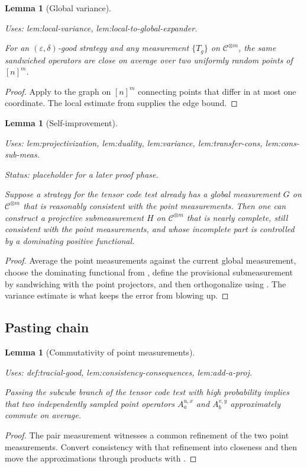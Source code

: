 \documentclass{article}
\providecommand{\uses}[1]{\par\smallskip\noindent\emph{Uses:} #1.\par\smallskip}
\providecommand{\notready}{\par\smallskip\noindent\emph{Status: placeholder for a later proof phase.}\par\smallskip}
\newtheorem{lemma}[definition]{Lemma}
\theoremstyle{remark}
\newcommand{\code}{\mathcal{C}}
\newcommand{\eps}{\varepsilon}
\begin{document}
\begin{lemma}[Global variance]\label{lem:variance}
  \uses{lem:local-variance, lem:local-to-global-expander}
  For an $(\eps,\delta)$-good strategy and any measurement $\{T_g\}$ on $\code^{\otimes m}$, the same sandwiched operators are close on average over two uniformly random points of $[n]^m$.
\end{lemma}
\begin{proof}
  Apply  to the graph on $[n]^m$ connecting points that differ in at most one coordinate. The local estimate from  supplies the edge bound.
\end{proof}

\begin{lemma}[Self-improvement]\label{lem:self-improvement}
  \uses{lem:projectivization, lem:duality, lem:variance, lem:transfer-cons, lem:cons-sub-meas}
  \notready
  Suppose a strategy for the tensor code test already has a global measurement $G$ on $\code^{\otimes m}$ that is reasonably consistent with the point measurements. Then one can construct a projective submeasurement $H$ on $\code^{\otimes m}$ that is nearly complete, still consistent with the point measurements, and whose incomplete part is controlled by a dominating positive functional.
\end{lemma}
\begin{proof}
  Average the point measurements against the current global measurement, choose the dominating functional from , define the provisional submeasurement by sandwiching with the point projectors, and then orthogonalize using . The variance estimate is what keeps the error from blowing up.
\end{proof}

\subsection{Pasting chain}

\begin{lemma}[Commutativity of point measurements]\label{lem:a-comm}
  \uses{def:tracial-good, lem:consistency-consequences, lem:add-a-proj}
  Passing the subcube branch of the tensor code test with high probability implies that two independently sampled point operators $A^{u,x}_a$ and $A^{v,y}_b$ approximately commute on average.
\end{lemma}
\begin{proof}
  The pair measurement witnesses a common refinement of the two point measurements. Convert consistency with that refinement into closeness and then move the approximations through products with .
\end{proof}
\end{document}
